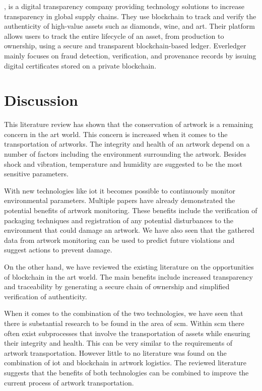 \textcite{everledger}, is a digital transparency company providing technology solutions to increase transparency in global supply chains. They use blockchain to track and verify the authenticity of high-value assets such as diamonds, wine, and art. Their platform allows users to track the entire lifecycle of an asset, from production to ownership, using a secure and transparent blockchain-based ledger. Everledger mainly focuses on fraud detection, verification, and provenance records by issuing digital certificates stored on a private blockchain.
\clearpage
\section{Discussion}
\label{sec:related_work_discussion}
This literature review has shown that the conservation of artwork is a remaining concern in the art world. This concern is increased when it comes to the transportation of artworks. The integrity and health of an artwork depend on a number of factors including the environment surrounding the artwork. Besides shock and vibration, temperature and humidity are suggested to be the most sensitive parameters.

With new technologies like \gls{iot} it becomes possible to continuously monitor environmental parameters. Multiple papers have already demonstrated the potential benefits of artwork monitoring. These benefits include the verification of packaging techniques and registration of any potential disturbances to the environment that could damage an artwork. We have also seen that the gathered data from artwork monitoring can be used to predict future violations and suggest actions to prevent damage.

On the other hand, we have reviewed the existing literature on the opportunities of blockchain in the art world. The main benefits include increased transparency and traceability by generating a secure chain of ownership and simplified verification of authenticity.

When it comes to the combination of the two technologies, we have seen that there is substantial research to be found in the area of \gls{scm}. Within \gls{scm} there often exist subprocesses that involve the transportation of assets while ensuring their integrity and health. This can be very similar to the requirements of artwork transportation. However little to no literature was found on the combination of \gls{iot} and blockchain in artwork logistics. The reviewed literature suggests that the benefits of both technologies can be combined to improve the current process of artwork transportation.
